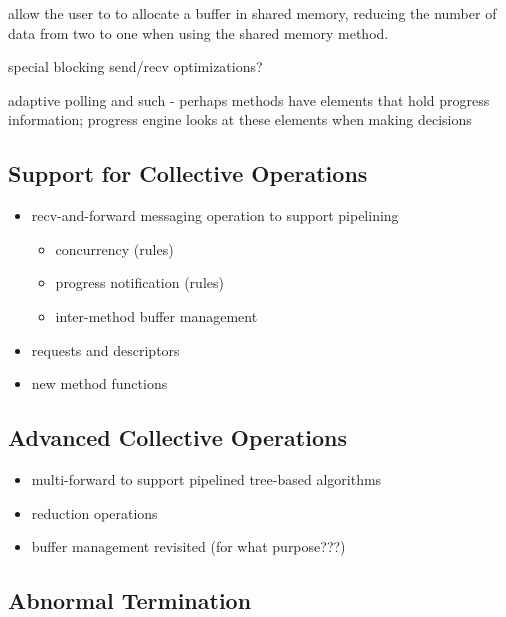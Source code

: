 allow the user to  to allocate a buffer in shared
memory, reducing the number of data from two to one when using the
shared memory method.

special blocking send/recv optimizations?

adaptive polling and such
- perhaps methods have elements that hold progress information; progress 
  engine looks at these elements when making decisions


\subsection{Support for Collective Operations}

\begin{itemize}
\item recv-and-forward messaging operation to support pipelining
  \begin{itemize}
  \item concurrency (rules)
  \item progress notification (rules)
  \item inter-method buffer management
  \end{itemize}
\item requests and descriptors
\item new method functions
\end{itemize}


\subsection{Advanced Collective Operations}

\begin{itemize}
\item multi-forward to support pipelined tree-based algorithms
\item reduction operations
\item buffer management revisited (for what purpose???)
\end{itemize}


\subsection{Abnormal Termination}

